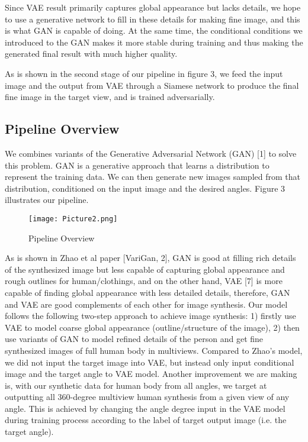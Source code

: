 \documentclass[10pt,conference]{IEEEtran}
\begin{document}
Since VAE result primarily captures global appearance but lacks details, we hope to use a generative network to fill in these details for making fine image, and this is what GAN is capable of doing. At the same time, the conditional conditions we introduced to the GAN makes it more stable during training and thus making the generated final result with much higher quality.

As is shown in the second stage of our pipeline in figure 3, we feed the input image and the output from VAE through a Siamese network to produce the final fine image in the target view, and is trained adversarially.

\subsection{Pipeline Overview}
We combines variants of the Generative Adversarial Network (GAN) [1] to solve this problem. GAN is a generative approach that learns a distribution to represent the training data. We can then generate new images sampled from that distribution, conditioned on the input image and the desired angles. Figure 3 illustrates our pipeline.

\begin{figure*}[htbp]
\centering
\texttt{[image: Picture2.png]}
\caption{Pipeline Overview}
\end{figure*}

As is shown in Zhao et al paper [VariGan, 2], GAN is good at filling rich details of the synthesized image but less capable of capturing global appearance and rough outlines for human/clothings, and on the other hand, VAE [7] is more capable of finding global appearance with less detailed details, therefore, GAN and VAE are good complements of each other for image synthesis. Our model follows the following two-step approach to achieve image synthesis: 1) firstly use VAE to model coarse global appearance (outline/structure of the image), 2) then use variants of GAN to model refined details of the person and get fine synthesized images of full human body in multiviews. Compared to Zhao's model, we did not input the target image into VAE, but instead only input conditional image and the target angle to VAE model. Another improvement we are making is, with our synthetic data for human body from all angles, we target at outputting all 360-degree multiview human synthesis from a given view of any angle. This is achieved by changing the angle degree input in the VAE model during training process according to the label of target output image (i.e. the target angle). 
\end{document}
